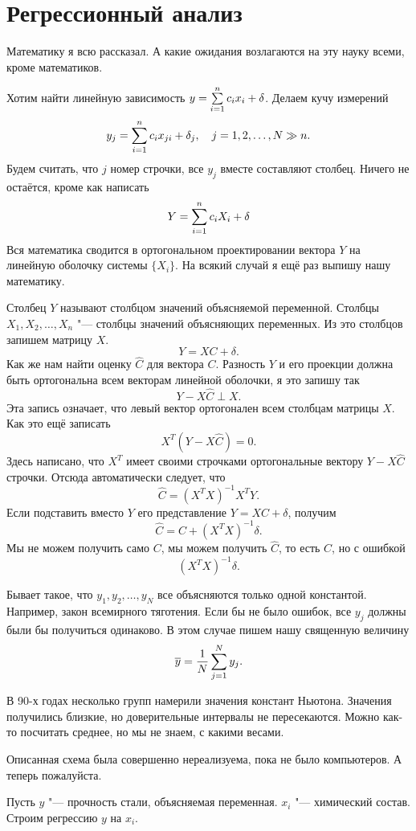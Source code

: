 \section{Регрессионный анализ}
Математику я всю рассказал. А какие ожидания возлагаются на эту науку всеми, кроме математиков.

Хотим найти линейную зависимость $y = \sum\limits_{i = 1}^{n} c_i x_i + \delta$. Делаем кучу измерений
\[
  y_j = \sum\limits_{i = 1}^{n} c_i x_{ji} + \delta_j,\quad j=1,2,\dots,N\gg n.
\]
Будем считать, что $j$ номер строчки, все $y_j$ вместе составляют столбец. Ничего не остаётся, кроме как написать
\[
  Y = \sum\limits_{i = 1}^{n} c_i X_i + \delta
\]
Вся математика сводится в ортогональном проектировании вектора $Y$ на линейную оболочку системы $\{X_i\}$. На всякий случай я ещё раз выпишу нашу математику.

Столбец $Y$ называют столбцом значений объясняемой переменной. Столбцы $X_1,X_2,\dots, X_n$ "--- столбцы значений объясняющих переменных. Из это столбцов запишем матрицу $X$.
\[
  Y = X C + \delta.
\]
Как же нам найти оценку $\hat C$ для вектора $C$. Разность $Y$ и его проекции должна быть ортогональна всем векторам линейной оболочки, я это запишу так
\[
  Y - X \hat C\perp X.
\]
Эта запись означает, что левый вектор ортогонален всем столбцам матрицы $X$. Как это ещё записать
\[
  X^T(Y-X\hat C) = 0.
\]
Здесь написано, что $X^T$ имеет своими строчками ортогональные вектору $Y-X\hat C$ строчки. Отсюда автоматически следует, что 
\[
  \hat C =  (X^T X)^{-1} X^T Y.
\]
Если подставить вместо $Y$ его представление $Y = XC + \delta$, получим
\[
  \hat C = C + (X^TX)^{-1}\delta.
\]
Мы не можем получить само $C$, мы можем получить $\hat C$, то есть $C$, но с ошибкой
\[
  (X^TX)^{-1}\delta.
\]

Бывает такое, что $y_1,y_2,\dots,y_N$ все объясняются только одной константой. Например, закон всемирного тяготения. Если бы не было ошибок, все $y_j$ должны были бы получиться одинаково. В этом случае пишем нашу священную величину
\[
  \overline{y} = \frac1N\sum\limits_{j = 1}^{N}y_j.
\]

В 90-х годах несколько групп намерили значения констант Ньютона. Значения получились близкие, но доверительные интервалы не пересекаются. Можно как-то посчитать среднее, но мы не знаем, с какими весами.

Описанная схема была совершенно нереализуема, пока не было компьютеров. А теперь пожалуйста.

Пусть $y$ "--- прочность стали, объясняемая переменная. $x_i$ "--- химический состав. Строим регрессию $y$ на $x_i$.

